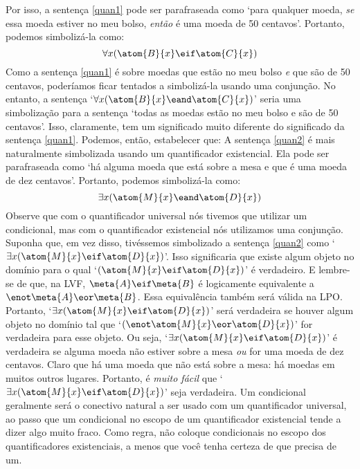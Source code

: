 Por isso, a sentença \ref{quan1} pode ser parafraseada como `para qualquer moeda, \emph{se} essa moeda estiver no meu bolso, \emph{então} é uma moeda de 50 centavos'.
Portanto, podemos simbolizá-la como:
$$\forall x(\atom{B}{x} \eif \atom{C}{x})$$
Como a sentença \ref{quan1} é sobre moedas que estão no meu bolso \emph{e} que são de 50 centavos, poderíamos ficar tentados a simbolizá-la usando uma conjunção.
No entanto, a sentença `$\forall x(\atom{B}{x} \eand \atom{C}{x})$' seria uma simbolização para a sentença `todas as moedas estão no meu bolso e são de 50 centavos'. Isso, claramente, tem um significado muito diferente do significado da sentença \ref{quan1}.
Podemos, então, estabelecer que:
A sentença \ref{quan2} é mais naturalmente simbolizada usando um quantificador existencial.
Ela pode ser parafraseada como `há alguma moeda que está sobre a mesa e que é uma moeda de dez centavos'.
Portanto, podemos simbolizá-la como:
$$\exists x(\atom{M}{x} \eand \atom{D}{x})$$
Observe que com o quantificador universal nós tivemos que utilizar um condicional, mas com o quantificador existencial nós utilizamos uma conjunção.
Suponha que, em vez disso, tivéssemos simbolizado a sentença \ref{quan2} como `$\exists x(\atom{M}{x} \eif \atom{D}{x})$'.
Isso significaria que existe algum objeto no domínio para o qual \hbox{`$(\atom{M}{x} \eif \atom{D}{x})$'} é verdadeiro.
E lembre-se de que, na LVF, \hbox{$\meta{A} \eif \meta{B}$} é logicamente equivalente a $\enot\meta{A} \eor \meta{B}$.
Essa equivalência também será válida na LPO.
Portanto, `$\exists x(\atom{M}{x} \eif \atom{D}{x})$' será verdadeira se houver algum objeto no domínio tal que `$(\enot \atom{M}{x} \eor \atom{D}{x})$' for verdadeira para esse objeto.
Ou seja, `$\exists x (\atom{M}{x} \eif \atom{D}{x})$' é verdadeira se alguma moeda não estiver sobre a mesa \emph{ou} for uma moeda de dez centavos.
Claro que há uma moeda que não está sobre a mesa: há moedas em muitos outros lugares.
Portanto, é \emph{muito fácil} que `$\exists x(\atom{M}{x} \eif \atom{D}{x})$' seja verdadeira.
Um condicional geralmente será o conectivo natural a ser usado com um quantificador universal, ao passo que um condicional no escopo de um quantificador existencial tende a dizer algo muito fraco.
Como regra, não coloque condicionais no escopo dos quantificadores existenciais, a menos que você tenha certeza de que precisa de um.
